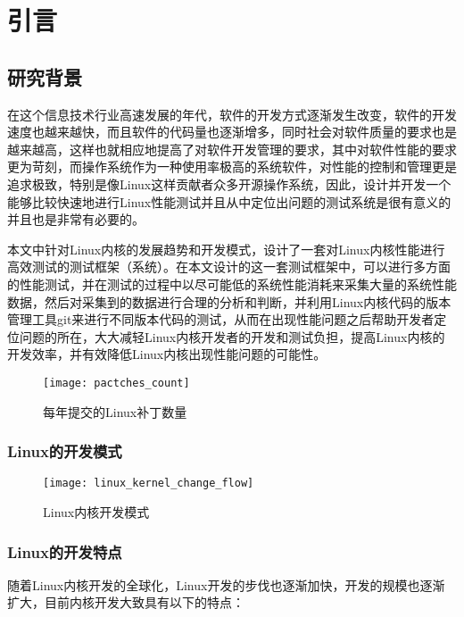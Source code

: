 
\chapter{引言}


\section{研究背景}

在这个信息技术行业高速发展的年代，软件的开发方式逐渐发生改变，软件的开发速度也越来越快，而且软件的代码量也逐渐增多，同时社会对软件质量的要求也是越来越高，这样也就相应地提高了对软件开发管理的要求，其中对软件性能的要求更为苛刻，而操作系统作为一种使用率极高的系统软件，对性能的控制和管理更是追求极致，特别是像Linux这样贡献者众多开源操作系统，因此，设计并开发一个能够比较快速地进行Linux性能测试并且从中定位出问题的测试系统是很有意义的并且也是非常有必要的。

本文中针对Linux内核的发展趋势和开发模式，设计了一套对Linux内核性能进行高效测试的测试框架（系统）。在本文设计的这一套测试框架中，可以进行多方面的性能测试，并在测试的过程中以尽可能低的系统性能消耗来采集大量的系统性能数据，然后对采集到的数据进行合理的分析和判断，并利用Linux内核代码的版本管理工具git来进行不同版本代码的测试，从而在出现性能问题之后帮助开发者定位问题的所在，大大减轻Linux内核开发者的开发和测试负担，提高Linux内核的开发效率，并有效降低Linux内核出现性能问题的可能性。


\begin{figure}[H]
\centering
\texttt{[image: pactches\_count]}
\caption{每年提交的Linux补丁数量}
\label{fig:pactches_count}
\end{figure}


\subsection{Linux的开发模式}

\begin{figure}[H]
\centering
\texttt{[image: linux\_kernel\_change\_flow]}
\caption{Linux内核开发模式}
\label{fig:linux_kernel_change_flow}
\end{figure}

\subsection{Linux的开发特点}

随着Linux内核开发的全球化，Linux开发的步伐也逐渐加快，开发的规模也逐渐扩大，目前内核开发大致具有以下的特点：


